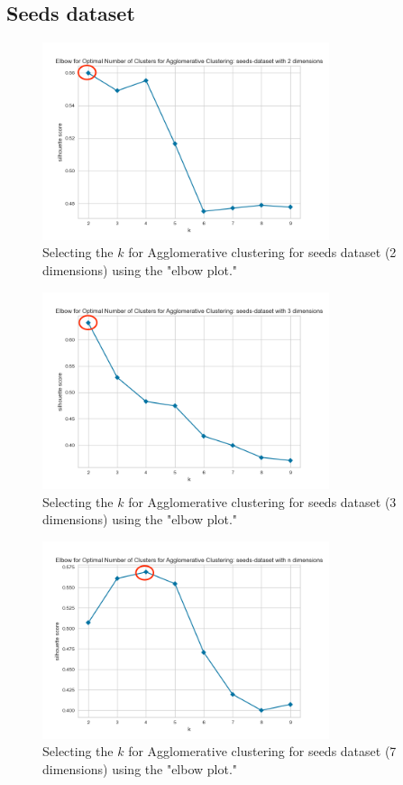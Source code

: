 \subsection{Seeds dataset}
\begin{figure}[H]
  \includegraphics[width=0.75\textwidth]{Method/images/k-values/seeds-dataset-2-agglomerative.png}
  \caption{Selecting the $k$ for Agglomerative clustering for seeds dataset (2 dimensions) using the "elbow plot."}
  \label{hyperparameters:agglomerative-seeds-dataset-2d}
\end{figure}
\begin{figure}[H]
  \includegraphics[width=0.75\textwidth]{Method/images/k-values/seeds-dataset-3-agglomerative.png}
  \caption{Selecting the $k$ for Agglomerative clustering for seeds dataset (3 dimensions) using the "elbow plot."}
  \label{hyperparameters:agglomerative-seeds-dataset-3d}
\end{figure}
\begin{figure}[H]
  \includegraphics[width=0.75\textwidth]{Method/images/k-values/seeds-dataset-n-agglomerative.png}
  \caption{Selecting the $k$ for Agglomerative clustering for seeds dataset (7 dimensions) using the "elbow plot."}
  \label{hyperparameters:agglomerative-seeds-dataset-7d}
\end{figure}
\newpage

